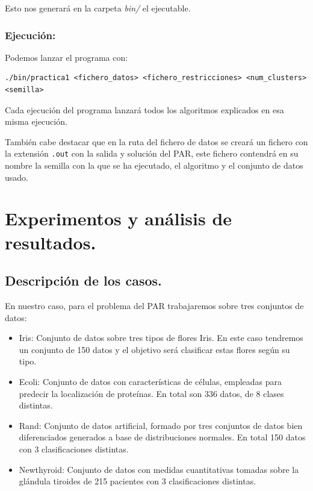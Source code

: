 \documentclass[12pt, spanish]{article}
\begin{document}
Esto nos generará en la carpeta \textit{bin/} el ejecutable.


\subsubsection{Ejecución:}

Podemos lanzar el programa con:

\begin{lstlisting}
./bin/practica1 <fichero_datos> <fichero_restricciones> <num_clusters> <semilla>
\end{lstlisting}

Cada ejecución del programa lanzará todos los algoritmos explicados en esa misma ejecución.

También cabe destacar que en la ruta del fichero de datos se creará un fichero con la extensión \texttt{.out} con la salida y solución del PAR, este fichero contendrá en su nombre la semilla con la que se ha ejecutado, el algoritmo y el conjunto de datos usado.


\newpage

\section{Experimentos y análisis de resultados.}


\subsection{Descripción de los casos.}

En nuestro caso, para el problema del PAR trabajaremos sobre tres conjuntos de datos:

\begin{itemize}
	\item{Iris: Conjunto de datos sobre tres tipos de flores Iris. En este caso tendremos un conjunto de 150 datos y el objetivo será clasificar estas flores según su tipo.}
	\item{Ecoli: Conjunto de datos con características de células, empleadas para predecir la localización de proteínas. En total son 336 datos, de 8 clases distintas.}
	\item{Rand: Conjunto de datos artificial, formado por tres conjuntos de datos bien diferenciados generados a base de distribuciones normales. En total 150 datos con 3 clasificaciones distintas.}
	\item{Newthyroid: Conjunto de datos con medidas cuantitativas tomadas sobre la glándula tiroides de 215 pacientes con 3 clasificaciones distintas.} 
\end{itemize}
\end{document}
